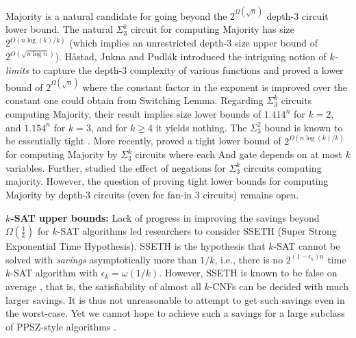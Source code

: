 \documentclass[10pt,a4paper]{article}
\begin{document}
\bigskip
Majority is a natural candidate 
for going beyond the $2^{\Omega(\sqrt{n})}$ depth-3 circuit lower bound.
The natural $\Sigma^k_3$ circuit for 
computing Majority has size $2^{O(n\log(k)/k)}$ (which implies an unrestricted depth-3 size upper bound of $2^{O(\sqrt{n\log n})}$). H\r{a}stad, Jukna and Pudl\'ak \cite{HastadJP95} introduced the intriguing notion of \emph{$k$-limits} to capture the depth-3 complexity of various functions  
and proved a lower bound of $2^{\Omega(\sqrt{n})}$ where the constant factor in the 
exponent is improved  over the constant one could obtain from Switching Lemma. 
Regarding $\Sigma^k_3$ circuits computing Majority, their result implies size lower bounds of  $1.414^n$ for $k = 2$, and $1.154^n$ for $k = 3$, and for $k \ge 4$ it yields nothing. The $\Sigma^2_3$ bound is known to be essentially tight \cite{PaturiSZ00}. More recently,
\cite{LecomteRT22} proved a tight lower bound of $2^{\Omega(n\log(k)/k)}$ for 
computing Majority by $\Sigma^k_3$ circuits where each 
And gate depends on at most $k$ variables.
Further, \cite{Amano23Majority} studied the effect of negations for $\Sigma^k_3$ circuits computing majority.
However, the question of proving tight lower bounds for computing Majority by depth-3 circuits 
(even for fan-in 3 circuits) remains open.



\bigskip
\noindent
{\bf $k$-SAT upper bounds:}
Lack of progress in improving the savings beyond $\Omega(\frac{1}{k})$
for $k$-SAT algorithms led researchers to consider
SSETH (Super Strong Exponential Time Hypothesis).
SSETH is the hypothesis that $k$-SAT cannot be solved with \emph{savings} asymptotically 
more than $1/k$, i.e., 
there is no $2^{(1 - \epsilon_k)n}$ time $k$-SAT 
algorithm with $\epsilon_k = \omega(1/k)$. 
However, SSETH is known to be 
false on average \cite{DBLP:conf/sat/VyasW19,LincolnY20}, 
that is, 
the satisfiability of almost all $k$-CNFs can be decided with 
much larger savings. 
It is thus not unreasonable to attempt to get such savings 
even in the worst-case. 
Yet we cannot hope to achieve such a savings for 
a large subclass of PPSZ-style algorithms \cite{DBLP:conf/coco/SchederT20}.
\end{document}
